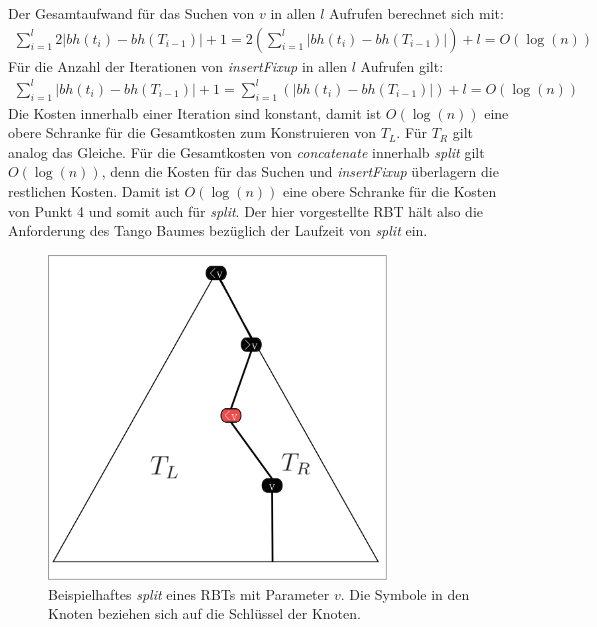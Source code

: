 \documentclass[a4paper,12pt]{article}
\begin{document}
\noindent Der Gesamtaufwand für das Suchen von $v$ in allen $l$ Aufrufen berechnet sich mit: 
\begin{align*}
\sum_{i = 1}^{l}  2 \vert\mathit{bh}(t_{i}) -\mathit{bh}(T_{i-1}) \vert + 1 =
2 \left( \sum_{i = 1}^{l}   \vert\mathit{bh}(t_{i}) -\mathit{bh}(T_{i-1}) \vert \right)+ l
= O \left(\log \left(n \right) \right)
\end{align*}
\noindent Für die Anzahl der Iterationen von \textit{insertFixup} in allen $l$ Aufrufen gilt: 
\begin{align*}
\sum_{i = 1}^{l}   \vert\mathit{bh}(t_{i}) -\mathit{bh}(T_{i-1}) \vert +1 =
\sum_{i = 1}^{l}  \left( \vert\mathit{bh}(t_{i}) -\mathit{bh}(T_{i-1}) \vert \right) + l 
= O \left(\log \left(n \right) \right)
\end{align*}
Die Kosten innerhalb einer Iteration sind konstant, damit ist  $O \left(\log \left(n \right) \right)$ eine obere Schranke für die Gesamtkosten zum Konstruieren von $T_L$. Für $T_R$ gilt analog das Gleiche. Für die Gesamtkosten von \textit{concatenate} innerhalb \textit{split} gilt $O \left(\log \left(n \right) \right)$, denn die Kosten für das Suchen und \textit{insertFixup} überlagern die restlichen Kosten. Damit ist $O \left(\log \left(n \right) \right)$ eine obere Schranke für die Kosten von Punkt 4 und somit auch für \textit{split}. Der hier vorgestellte RBT hält also die Anforderung des Tango Baumes bezüglich der Laufzeit von \textit{split} ein.


\begin{figure}[H]
	\centering
	\includegraphics[width=0.8\textwidth]{Medien/RotSchwarzBaum/aufteilen}
	\caption{Beispielhaftes \textit{split} eines RBTs mit Parameter $v$. Die Symbole in den Knoten beziehen sich auf die Schlüssel der Knoten. }
	\label{fig:aufteilen}
\end{figure}
\end{document}
